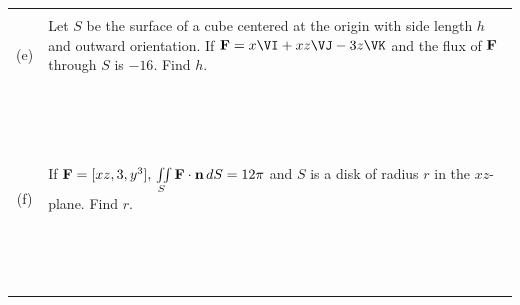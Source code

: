 \documentclass[12pt]{amsart}
\numberwithin{equation}{section}
\begin{document}
{{{{\setlength{\extrarowheight}{-0.4cm}
\begin{tabular}{|cp{17.74cm}|}
	&\\
	\, (e)& 
	Let $S$ be the surface of a cube centered at the origin with side length $h$ and outward orientation.  If ${\bf F} = x\VI + xz\VJ - 3z\VK$ and the flux of ${\bf F}$ through $S$ is $-16$.  Find $h$.\\
	&\\&\\&\\&\\&\\&\\&\\&\\&\\&\\&\\&\\&\\&\\&\\
	\hline
	&\\
	\, (f)& 
	If ${\bf F} = [xz,3,y^3], \, \iint \limits_{S} {\bf F} \cdot {\bf n} \, dS = 12\pi$ and $S$ is a disk of radius $r$ in the $xz$-plane. Find $r$.\\
	&\\&\\&\\&\\&\\&\\&\\&\\&\\&\\&\\&\\&\\&\\&\\
	\hline
\end{tabular}}

}}}
\end{document}
